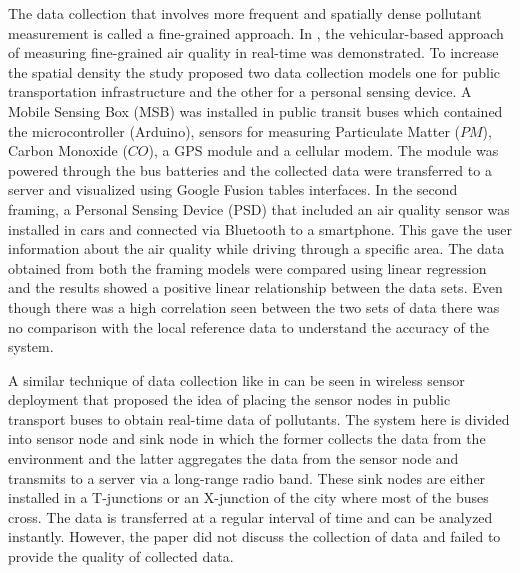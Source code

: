 The data collection that involves more frequent and spatially dense pollutant measurement is called a fine-grained approach. In \cite{Devarakonda2013}, the vehicular-based approach of measuring
fine-grained air quality in real-time was demonstrated. To increase the spatial density the study proposed two data collection models one for public transportation infrastructure and the other for a personal sensing device. A Mobile Sensing Box (MSB) was installed in public transit buses which contained the microcontroller (Arduino), sensors for measuring Particulate Matter ($PM$), Carbon Monoxide ($CO$), a GPS module and a cellular modem. The module was powered through the bus batteries and the collected data were transferred to a server and visualized using Google Fusion tables interfaces. In the second framing, a Personal Sensing Device (PSD) that included an air quality sensor was installed in cars and connected via Bluetooth to a smartphone. This gave the user information about the air quality while driving through a specific area.
The data obtained from both the framing models were compared using linear regression and the results showed a positive linear relationship between the data sets. Even though there was a high correlation seen between the two sets of data there was no comparison with the local reference data to understand the accuracy of the system.

\par

A similar technique of data collection like in \cite{Devarakonda2013} can be seen in wireless sensor deployment \cite{Saha2017} that proposed the idea of placing the sensor nodes in public transport buses to obtain real-time data of pollutants. The system here is divided into sensor node and sink node in which the former collects the data from the environment and the latter aggregates the data from the sensor node and transmits to a server via a long-range radio band. These sink nodes are either installed in a T-junctions or an X-junction of the city where most of the buses cross. The data is transferred at a regular interval of time and can be analyzed instantly. However, the paper did not discuss the collection of data and failed to provide the quality of collected data.




